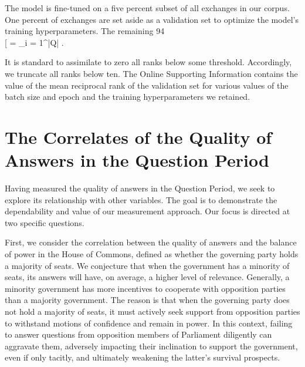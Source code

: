 {{The model is fine-tuned on a five percent subset of all exchanges in our corpus. One percent of exchanges are set aside as a validation set to optimize the model's training hyperparameters. The remaining 94\\[
     =  \sum_{i = 1}^{\left|Q\right|} .
\]

It is standard to assimilate to zero all ranks below some threshold. Accordingly, we truncate all ranks below ten. The Online Supporting Information contains the value of the mean reciprocal rank of the validation set for various values of the batch size and epoch and the training hyperparameters we retained.

\section*{The Correlates of the Quality of Answers in the Question Period}

Having measured the quality of answers in the Question Period, we seek to explore its relationship with other variables. The goal is to demonstrate the dependability and value of our measurement approach. Our focus is directed at two specific questions.

First, we consider the correlation between the quality of answers and the balance of power in the House of Commons, defined as whether the governing party holds a majority of seats. We conjecture that when the government has a minority of seats, its answers will have, on average, a higher level of relevance. Generally, a minority government has more incentives to cooperate with opposition parties than a majority government. The reason is that when the governing party does not hold a majority of seats, it must actively seek support from opposition parties to withstand motions of confidence and remain in power. In this context, failing to answer questions from opposition members of Parliament diligently can aggravate them, adversely impacting their inclination to support the government, even if only tacitly, and ultimately weakening the latter’s survival prospects.

}}

